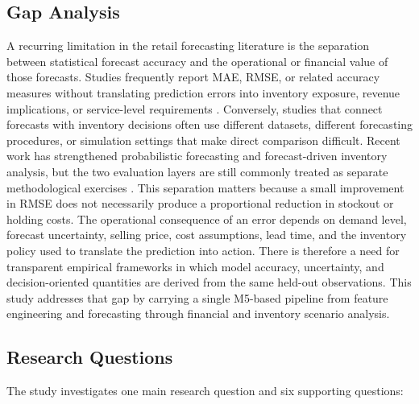 \subsection{Gap Analysis}

A recurring limitation in the retail forecasting literature is the separation between statistical forecast accuracy and the operational or financial value of those forecasts.
Studies frequently report MAE, RMSE, or related accuracy measures without translating prediction errors into inventory exposure, revenue implications, or service-level requirements \cite{Theodorou2025Inventory,Gonzalez2025AccuracyPerformance}.
Conversely, studies that connect forecasts with inventory decisions often use different datasets, different forecasting procedures, or simulation settings that make direct comparison difficult.
Recent work has strengthened probabilistic forecasting and forecast-driven inventory analysis, but the two evaluation layers are still commonly treated as separate methodological exercises \cite{Long2025ProbRetail,Mohammed2026Uncertainty}.
This separation matters because a small improvement in RMSE does not necessarily produce a proportional reduction in stockout or holding costs.
The operational consequence of an error depends on demand level, forecast uncertainty, selling price, cost assumptions, lead time, and the inventory policy used to translate the prediction into action.
There is therefore a need for transparent empirical frameworks in which model accuracy, uncertainty, and decision-oriented quantities are derived from the same held-out observations.
This study addresses that gap by carrying a single M5-based pipeline from feature engineering and forecasting through financial and inventory scenario analysis.

\subsection{Research Questions}

The study investigates one main research question and six supporting questions:

